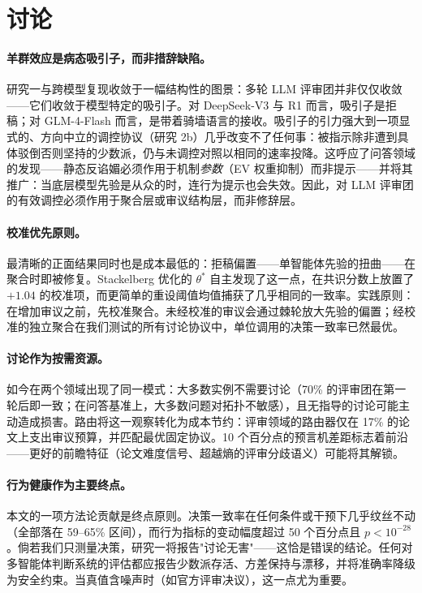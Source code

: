 \section{讨论}
\label{sec:discussion}

\paragraph{羊群效应是病态吸引子，而非措辞缺陷。}
研究一与跨模型复现收敛于一幅结构性的图景：多轮 LLM 评审团并非仅仅收敛——它们收敛于模型特定的吸引子。对 DeepSeek-V3 与 R1 而言，吸引子是拒稿；对 GLM-4-Flash 而言，是带着骑墙语言的接收。吸引子的引力强大到一项显式的、方向中立的调控协议（研究 2b）几乎改变不了任何事：被指示除非遭到具体驳倒否则坚持的少数派，仍与未调控对照以相同的速率投降。这呼应了问答领域的发现——静态反谄媚必须作用于机制\emph{参数}（EV 权重抑制）而非提示——并将其推广：当底层模型先验是从众的时，连行为提示也会失效。因此，对 LLM 评审团的有效调控必须作用于聚合层或审议结构层，而非修辞层。

\paragraph{校准优先原则。}
最清晰的正面结果同时也是成本最低的：拒稿偏置——单智能体先验的扭曲——在聚合时即被修复。Stackelberg 优化的 $\theta^*$ 自主发现了这一点，在共识分数上放置了 $+1.04$ 的校准项，而更简单的重设阈值均值捕获了几乎相同的一致率。实践原则：在增加审议之前，先校准聚合。未经校准的审议会通过棘轮放大先验的偏置；经校准的独立聚合在我们测试的所有讨论协议中，单位调用的决策一致率已然最优。

\paragraph{讨论作为按需资源。}
如今在两个领域出现了同一模式：大多数实例不需要讨论（70\% 的评审团在第一轮后即一致；在问答基准上，大多数问题对拓扑不敏感），且无指导的讨论可能主动造成损害。路由将这一观察转化为成本节约：评审领域的路由器仅在 17\% 的论文上支出审议预算，并匹配最优固定协议。10 个百分点的预言机差距标志着前沿——更好的前瞻特征（论文难度信号、超越熵的评审分歧语义）可能将其解锁。

\paragraph{行为健康作为主要终点。}
本文的一项方法论贡献是终点原则。决策一致率在任何条件或干预下几乎纹丝不动（全部落在 59--65\% 区间），而行为指标的变动幅度超过 50 个百分点且 $p{<}10^{-28}$。倘若我们只测量决策，研究一将报告"讨论无害"——这恰是错误的结论。任何对多智能体判断系统的评估都应报告少数派存活、方差保持与漂移，并将准确率降级为安全约束。当真值含噪声时（如官方评审决议），这一点尤为重要。

